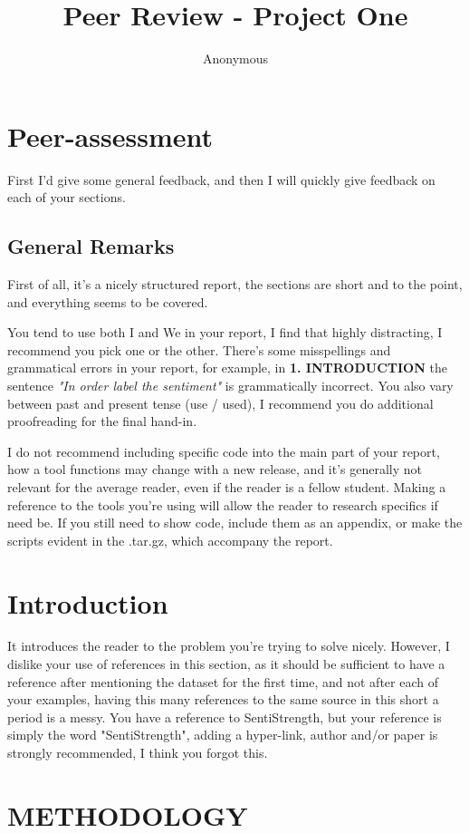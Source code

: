 \documentclass[11pt]{article} %
\title{Peer Review - Project One}
\author{Anonymous}
\begin{document}
\maketitle

\section*{Peer-assessment}
First I'd give some general feedback, and then I will quickly give feedback on each of your sections.
\subsection*{General Remarks}
First of all, it's a nicely structured report, the sections are short and to the point, and everything seems to be covered.

You tend to use both I and We in your report, I find that highly distracting, I recommend you pick one or the other. There's some misspellings and grammatical errors in your report, for example, in \textbf{1. INTRODUCTION} the sentence \textit{"In order label the sentiment"} is grammatically incorrect. You also vary between past and present tense (use / used), I recommend you do additional proofreading for the final hand-in.

I do not recommend including specific code into the main part of your report, how a tool functions may change with a new release, and it's generally not relevant for the average reader, even if the reader is a fellow student. Making a reference to the tools you're using will allow the reader to research specifics if need be. If you still need to show code, include them as an appendix, or make the scripts evident in the .tar.gz, which accompany the report.

\section*{Introduction}
It introduces the reader to the problem you're trying to solve nicely. However, I dislike your use of references in this section, as it should be sufficient to have a reference after mentioning the dataset for the first time, and not after each of your examples, having this many references to the same source in this short a period is a messy. You have a reference to SentiStrength, but your reference is simply the word "SentiStrength", adding a hyper-link, author and/or paper is strongly recommended, I think you forgot this.

\section*{METHODOLOGY}
\end{document}

